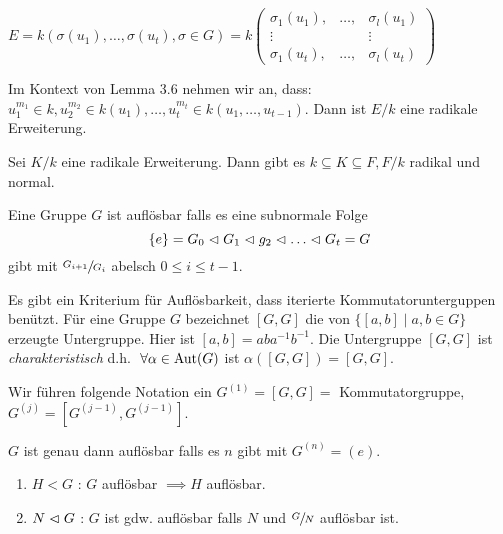 \begin{lemma}
	$E = k(\sigma(u_1),\ldots,\sigma(u_{t}), \sigma \in G) = k \begin{pmatrix} 
		\sigma_1(u_1), &\ldots, &\sigma_{l}(u_1)\\
		\vdots & &\vdots\\
		\sigma_1(u_{t}), &\ldots, &\sigma_{l}(u_{t})
	\end{pmatrix} $
\end{lemma}


\begin{lemma}
	Im Kontext von Lemma 3.6 nehmen wir an, dass: $u_1^{m_1} \in k, u_2^{m_2} \in k(u_1),\ldots, u_{t}^{m_{t}} \in k(u_1,\ldots,u_{t-1})$.
	Dann ist $E / k$ eine radikale Erweiterung.
\end{lemma}


\begin{corollary}
	Sei $K / k$ eine radikale Erweiterung. Dann gibt es $k \subseteq K \subseteq F, F / k$ radikal und normal.
\end{corollary}


\begin{definition}[Algebra I]
	Eine Gruppe $G$ ist auflösbar falls es eine subnormale Folge
	\[
	\{e\} = G_0 \vartriangleleft G_1 \vartriangleleft g_2 \vartriangleleft \ldots \vartriangleleft G_{t} = G
	\]
	gibt mit $\sfrac{G_{i+1}}{G_{i}}$ abelsch $0 \leq i \leq t-1$.
\end{definition}


Es gibt ein Kriterium für Auflösbarkeit, dass iterierte Kommutatorunterguppen benützt.
Für eine Gruppe $G$ bezeichnet $[G,G]$ die von $\{[a,b] \mid a,b \in G\} $ erzeugte Untergruppe.
Hier ist $[a,b] = a b a^{-1} b^{-1}$.
Die Untergruppe $[G,G]$ ist \emph{charakteristisch} d.h. $\forall \alpha \in \aut(G)$ ist $\alpha([G,G]) = [G,G]$.

Wir führen folgende Notation ein $G^{(1)} = [G,G] = $ Kommutatorgruppe, $G^{(j)} = [G^{(j-1)},G^{(j-1)}]$.
\begin{proposition}
	$G$ ist genau dann auflösbar falls es $n$ gibt mit $G^{(n)} = (e)$.
\end{proposition}


\begin{proposition}
	\begin{enumerate}[(1)]
		\item $H < G$ : $G$ auflösbar $\implies H$  auflösbar.
		\item $N \vartriangleleft G$ : $G$ ist gdw. auflösbar falls $N$ und $\sfrac{G}{N}$ auflösbar ist.
	\end{enumerate}
\end{proposition}



